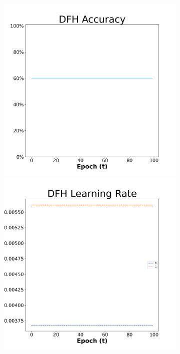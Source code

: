 \begin{figure}[H]
    \centering %
\begin{subfigure}{0.3\textwidth}
  \includegraphics[width=\linewidth]{images/exper1/NSP/DFH_0.01_acc.png}
    \includegraphics[width=\linewidth]{images/exper1/NSP/DFH_0.01_lr.png}

\end{subfigure}
\end{figure}
